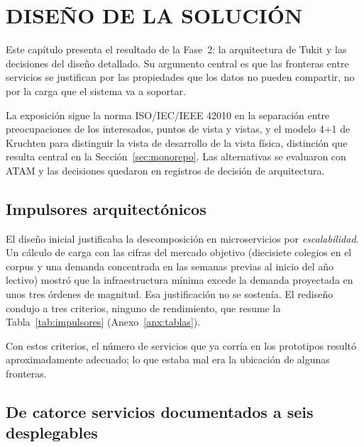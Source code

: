 \setcounter{subsection}{0}
\section{DISEÑO DE LA SOLUCIÓN}

Este capítulo presenta el resultado de la Fase~2: la arquitectura de Tukit y las decisiones del
diseño detallado. Su
argumento central es que las fronteras entre servicios se justifican por las propiedades que
los datos no pueden compartir, no por la carga que el sistema va a soportar.

La exposición sigue la norma ISO/IEC/IEEE 42010 \citep{iso_42010_2022} en la separación
entre preocupaciones de los interesados, puntos de vista y vistas, y el modelo 4+1 de
Kruchten \citep{kruchten_41_1995} para distinguir la vista de desarrollo de la vista
física, distinción que resulta central en la Sección~\ref{sec:monorepo}. Las alternativas se
evaluaron con ATAM y las decisiones quedaron en registros de decisión de arquitectura.

\subsection{Impulsores arquitectónicos}
\label{sec:impulsores}

El diseño inicial justificaba la descomposición en microservicios por
\emph{escalabilidad}. Un cálculo de carga con las cifras del mercado objetivo (diecisiete
colegios en el corpus y una demanda concentrada en las semanas previas al inicio del año
lectivo) mostró que la infraestructura mínima excede la demanda proyectada en unos tres
órdenes de magnitud. Esa justificación no se sostenía. El rediseño condujo a tres criterios,
ninguno de rendimiento, que resume la Tabla~\ref{tab:impulsores} (Anexo~\ref{anx:tablas}).


Con estos criterios, el número de servicios que ya corría en los prototipos resultó
aproximadamente adecuado; lo que estaba mal era la ubicación de algunas fronteras.

\subsection{De catorce servicios documentados a seis desplegables}
\label{sec:consolidacion}

